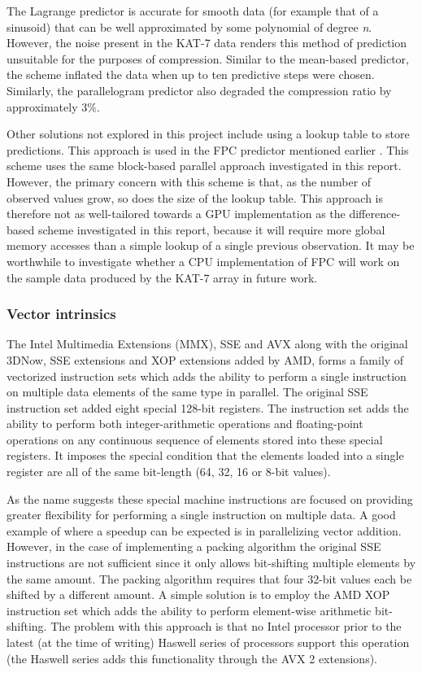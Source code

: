   The Lagrange predictor is accurate for smooth data (for example that of a sinusoid) that can be well approximated by some polynomial of degree \textit{n}. However, the noise present in the KAT-7 data renders this
  method of prediction unsuitable for the purposes of compression. Similar to the mean-based predictor, the scheme inflated the data when up to ten predictive steps were chosen. Similarly, the parallelogram predictor 
  also degraded the compression ratio by approximately 3\%.
  
  Other solutions not explored in this project include using a lookup table to store predictions. This approach is used in the FPC predictor mentioned earlier \cite{4589203,4976448}.
  This scheme uses the same block-based parallel approach investigated in this report. However, the primary concern with this 
  scheme is that, as the number of observed values grow, so does the size of the lookup table. This approach is therefore not as well-tailored towards a GPU implementation as the difference-based scheme investigated 
  in this report, because it will require more global memory accesses than a simple lookup of a single previous observation. It may be worthwhile to investigate whether a CPU implementation of FPC will work on the sample 
  data produced by the KAT-7 array in future work.
  \subsubsection{Vector intrinsics}
  The Intel Multimedia Extensions (MMX), SSE and AVX along with the original 3DNow, SSE extensions and XOP extensions added by AMD, forms a family of vectorized instruction sets which adds the ability to 
  perform a single instruction on multiple data elements of the same type in parallel. The original SSE instruction set added eight special 128-bit registers. The instruction set adds 
  the ability to perform both integer-arithmetic operations and floating-point operations on any continuous sequence of elements stored into these special registers. It imposes the special condition that the 
  elements loaded into a single register are all of the same bit-length (64, 32, 16 or 8-bit values).
  
  As the name suggests these special machine instructions are focused on providing greater flexibility for performing a single instruction on multiple data. A good example of where
  a speedup can be expected is in parallelizing vector addition. However, in the case of implementing a packing algorithm the original SSE instructions are not sufficient since it only allows 
  bit-shifting multiple elements by the same amount. The packing algorithm requires that four 32-bit values each be shifted by a different amount. A simple solution is to employ the AMD XOP 
  instruction set which adds the ability to perform element-wise arithmetic bit-shifting. The problem with this approach is that no Intel processor prior to the latest (at the time of writing) 
  Haswell series of processors support this operation (the Haswell series adds this functionality through the AVX 2 extensions).
  
